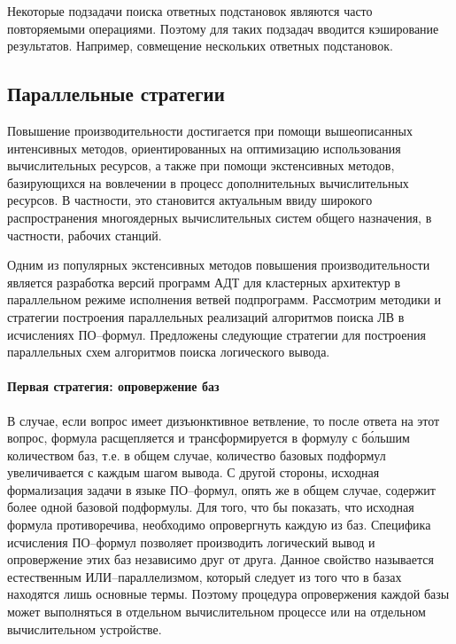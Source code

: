 Некоторые подзадачи поиска ответных подстановок являются часто повторяемыми операциями. Поэтому для таких подзадач вводится кэширование результатов. Например, совмещение нескольких ответных подстановок.


\subsection{Параллельные стратегии}

Повышение производительности достигается при помощи вышеописанных интенсивных методов, ориентированных на оптимизацию использования вычислительных ресурсов, а также при помощи экстенсивных методов, базирующихся на вовлечении в процесс дополнительных вычислительных ресурсов. В частности, это становится актуальным ввиду широкого распространения многоядерных вычислительных систем общего назначения, в частности, рабочих станций.

Одним из популярных экстенсивных методов повышения производительности является разработка версий программ АДТ для кластерных архитектур в параллельном режиме исполнения ветвей подпрограмм. Рассмотрим методики и стратегии построения параллельных реализаций алгоритмов поиска ЛВ в исчислениях ПО--формул. Предложены следующие стратегии для построения параллельных схем алгоритмов поиска логического вывода.

\paragraph{Первая стратегия: опровержение баз}

В случае, если вопрос имеет дизъюнктивное ветвление, то после ответа на этот вопрос, формула расщепляется и трансформируется в формулу с б\'{о}льшим количеством баз, т.е. в общем случае, количество базовых подформул увеличивается с каждым шагом вывода. С другой стороны, исходная формализация задачи в языке ПО--формул, опять же в общем случае, содержит более одной базовой подформулы. Для того, что бы показать, что исходная формула противоречива, необходимо опровергнуть каждую из баз. Специфика исчисления ПО--формул позволяет производить логический вывод и опровержение этих баз независимо друг от друга. Данное свойство называется естественным ИЛИ--параллелизмом, который следует из того что в базах находятся лишь основные термы. Поэтому процедура опровержения каждой базы может выполняться в отдельном вычислительном процессе или на отдельном вычислительном устройстве.

